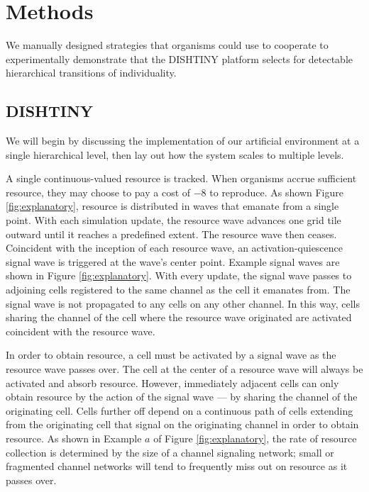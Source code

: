 \section{Methods}

We manually designed strategies that organisms could use to cooperate to experimentally demonstrate that the DISHTINY platform selects for detectable hierarchical transitions of individuality.

\subsection{DISHTINY}



We will begin by discussing the implementation of our artificial environment at a single hierarchical level, then lay out how the system scales to multiple levels.

A single continuous-valued resource is tracked.
When organisms accrue sufficient resource, they may choose to pay a cost of $-8$ to reproduce.
As shown Figure \ref{fig:explanatory}, resource is distributed in waves that emanate from a single point.
With each simulation update, the resource wave advances one grid tile outward until it reaches a predefined extent.
The resource wave then ceases.
Coincident with the inception of each resource wave, an activation-quiescence signal wave is triggered at the wave's center point.
Example signal waves are shown in Figure \ref{fig:explanatory}.
With every update, the signal wave passes to adjoining cells registered to the same channel as the cell it emanates from.
The signal wave is not propagated to any cells on any other channel.
In this way, cells sharing the channel of the cell where the resource wave originated are activated coincident with the resource wave.

In order to obtain resource, a cell must be activated by a signal wave as the resource wave passes over.
The cell at the center of a resource wave will always be activated and absorb resource.
However, immediately adjacent cells can only obtain resource by the action of the signal wave --- by sharing the channel of the originating cell.
Cells further off depend on a continuous path of cells extending from the originating cell that signal on the originating channel in order to obtain resource.
As shown in Example $a$ of Figure \ref{fig:explanatory}, the rate of resource collection is determined by the size of a channel signaling network; small or fragmented channel networks will tend to frequently miss out on resource as it passes over.

